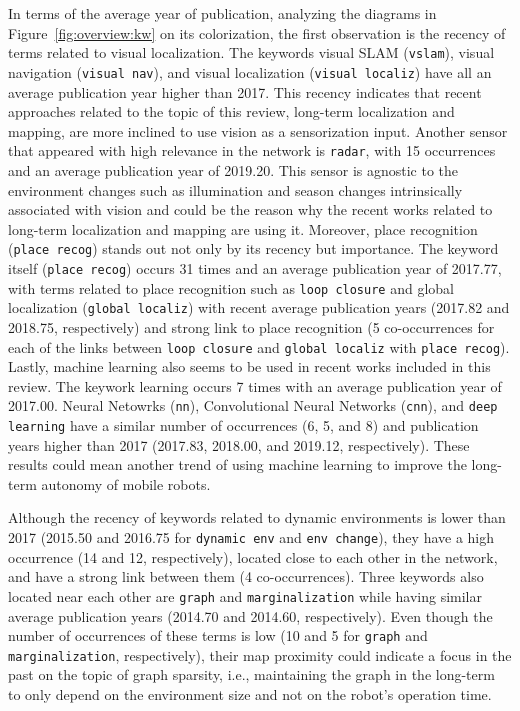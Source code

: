 In terms of the average year of publication, analyzing the diagrams in Figure~\ref{fig:overview:kw} on its colorization, the first observation is the recency of terms related to visual localization. The keywords visual SLAM (\texttt{vslam}), visual navigation (\texttt{visual nav}), and visual localization (\texttt{visual localiz}) have all an average publication year higher than 2017. This recency indicates that recent approaches related to the topic of this review, long-term localization and mapping, are more inclined to use vision as a sensorization input.
Another sensor that appeared with high relevance in the network is \texttt{radar}, with 15 occurrences and an average publication year of 2019.20. This sensor is agnostic to the environment changes such as illumination and season changes intrinsically associated with vision and could be the reason why the recent works related to long-term localization and mapping are using it.
Moreover, place recognition (\texttt{place recog}) stands out not only by its recency but importance. The keyword itself (\texttt{place recog}) occurs 31 times and an average publication year of 2017.77, with terms related to place recognition such as \texttt{loop closure} and global localization (\texttt{global localiz}) with recent average publication years (2017.82 and 2018.75, respectively) and strong link to place recognition (5 co-occurrences for each of the links between \texttt{loop closure} and \texttt{global localiz} with \texttt{place recog}). Lastly, machine learning also seems to be used in recent works included in this review. The keywork learning occurs 7 times with an average publication year of 2017.00. Neural Netowrks (\texttt{nn}), Convolutional Neural Networks (\texttt{cnn}), and \texttt{deep learning} have a similar number of occurrences (6, 5, and 8) and publication years higher than 2017 (2017.83, 2018.00, and 2019.12, respectively). These results could mean another trend of using machine learning to improve the long-term autonomy of mobile robots.

Although the recency of keywords related to dynamic environments is lower than 2017 (2015.50 and 2016.75 for \texttt{dynamic env} and \texttt{env change}), they have a high occurrence (14 and 12, respectively), located close to each other in the network, and have a strong link between them (4 co-occurrences). Three keywords also located near each other are \texttt{graph} and \texttt{marginalization} while having similar average publication years (2014.70 and 2014.60, respectively). Even though the number of occurrences of these terms is low (10 and 5 for \texttt{graph} and \texttt{ marginalization}, respectively), their map proximity could indicate a focus in the past on the topic of graph sparsity, i.e., maintaining the graph in the long-term to only depend on the environment size and not on the robot's operation time.

